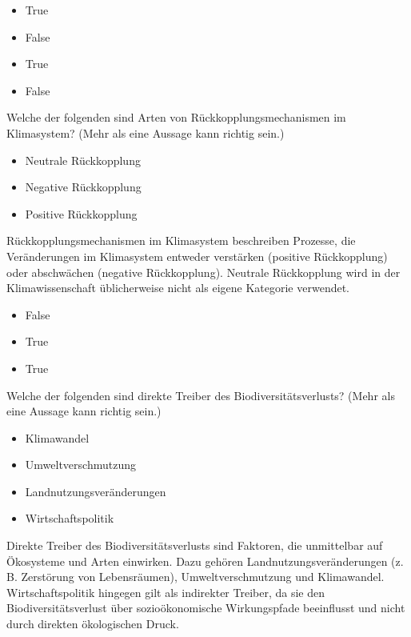 \documentclass[
  nswissgerman,
  a4paper,
  openany]{book}
\providecommand{\tightlist}{%
  \setlength{\itemsep}{0pt}\setlength{\parskip}{0pt}}
\begin{document}
\begin{itemize}
\tightlist
\item
  True
\item
  False
\item
  True
\item
  False
\end{itemize}

Welche der folgenden sind Arten von Rückkopplungsmechanismen im
Klimasystem? (Mehr als eine Aussage kann richtig sein.)

\begin{itemize}
\tightlist
\item[$\square$]
  Neutrale Rückkopplung
\item[$\square$]
  Negative Rückkopplung
\item[$\square$]
  Positive Rückkopplung
\end{itemize}

Rückkopplungsmechanismen im Klimasystem beschreiben Prozesse, die
Veränderungen im Klimasystem entweder verstärken (positive Rückkopplung)
oder abschwächen (negative Rückkopplung). Neutrale Rückkopplung wird in
der Klimawissenschaft üblicherweise nicht als eigene Kategorie
verwendet.

\begin{itemize}
\tightlist
\item
  False
\item
  True
\item
  True
\end{itemize}

Welche der folgenden sind direkte Treiber des Biodiversitätsverlusts?
(Mehr als eine Aussage kann richtig sein.)

\begin{itemize}
\tightlist
\item[$\square$]
  Klimawandel
\item[$\square$]
  Umweltverschmutzung
\item[$\square$]
  Landnutzungsveränderungen
\item[$\square$]
  Wirtschaftspolitik
\end{itemize}

Direkte Treiber des Biodiversitätsverlusts sind Faktoren, die
unmittelbar auf Ökosysteme und Arten einwirken. Dazu gehören
Landnutzungsveränderungen (z. B. Zerstörung von Lebensräumen),
Umweltverschmutzung und Klimawandel. Wirtschaftspolitik hingegen gilt
als indirekter Treiber, da sie den Biodiversitätsverlust über
sozioökonomische Wirkungspfade beeinflusst und nicht durch direkten
ökologischen Druck.
\end{document}
